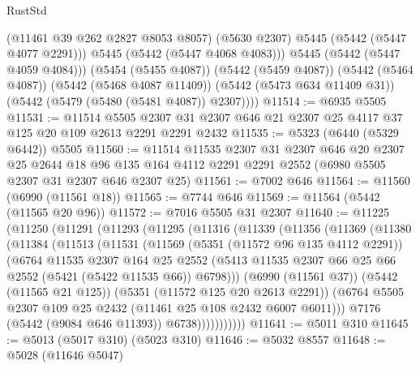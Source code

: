 \begin{lexlean}{RustStd}
\begin{coremodule}
{\begin{coremodule}
{{{{{{{{{{{{              (@11461 @39 @262 @2827 @8053 @8057)
              (@5630 @2307)
              @5445
              (@5442 (@5447 @4077 @2291)))
            @5445
            (@5442 (@5447 @4068 @4083)))
          @5445
          (@5442 (@5447 @4059 @4084)))
        (@5454 (@5455 @4087))
        (@5442 (@5459 @4087))
        (@5442 (@5464 @4087))
        (@5442 (@5468 @4087 @11409))
        (@5442 (@5473 @634 @11409 @31))
        (@5442 (@5479 (@5480 (@5481 @4087)) @2307))))
@11514 := @6935 @5505
@11531 := @11514
    @5505
    @2307
    @31
    @2307
    @646
    @21
    @2307
    @25
    @4117
    @37
    @125
    @20
    @109
    @2613
    @2291
    @2291
    @2432
@11535 := @5323 (@6440 (@5329 @6442)) @5505
@11560 := @11514
    @11535
    @2307
    @31
    @2307
    @646
    @20
    @2307
    @25
    @2644
    @18
    @96
    @135
    @164
    @4112
    @2291
    @2291
    @2552
    (@6980 @5505 @2307 @31 @2307 @646 @2307 @25)
@11561 := @7002 @646
@11564 := @11560 (@6990 (@11561 @18))
@11565 := @7744 @646
@11569 := @11564 (@5442 (@11565 @20 @96))
@11572 := @7016 @5505 @31 @2307
@11640 := @11225
    (@11250
      (@11291
        (@11293
          (@11295
            (@11316
              (@11339
                (@11356
                  (@11369
                    (@11380
                      (@11384
                        (@11513
                          (@11531
                            (@11569
                              (@5351 (@11572 @96 @135 @4112 @2291))
                              (@6764
                                @11535
                                @2307
                                @164
                                @25
                                @2552
                                (@5413
                                  @11535
                                  @2307
                                  @66
                                  @25
                                  @66
                                  @2552
                                  (@5421 (@5422 @11535 @66))
                                  @6798)))
                            (@6990 (@11561 @37))
                            (@5442 (@11565 @21 @125))
                            (@5351 (@11572 @125 @20 @2613 @2291))
                            (@6764 @5505 @2307 @109 @25 @2432 (@11461 @25 @108 @2432 @6007 @6011)))
                          @7176
                          (@5442 (@9084 @646 @11393))
                          @6738)))))))))))
@11641 := @5011 @310
@11645 := @5013 (@5017 @310) (@5023 @310)
@11646 := @5032 @8557
@11648 := @5028 (@11646 @5047)
}}}}}}}}}}}}
\end{coremodule}}
\end{coremodule}
\end{lexlean}
